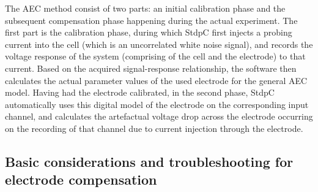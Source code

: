 \documentclass{article}
\begin{document}
The AEC method consist of two parts: an initial calibration phase and the
subsequent compensation phase happening during the actual experiment. The
first part is the calibration phase, during which StdpC first
injects a probing current into the cell (which is an uncorrelated white noise
signal), and records the voltage response of the system (comprising of
the cell and the electrode) to that current. Based on the
acquired signal-response relationship, the software then calculates the actual parameter
values of the used electrode for the general AEC model. Having had the
electrode calibrated, in the second phase, StdpC automatically uses
this digital model of the electrode on the corresponding input channel, and
calculates the artefactual voltage drop across the electrode occurring on
the recording of that channel due to current injection through the electrode.

\subsection{Basic considerations and troubleshooting for electrode compensation}
\end{document}
